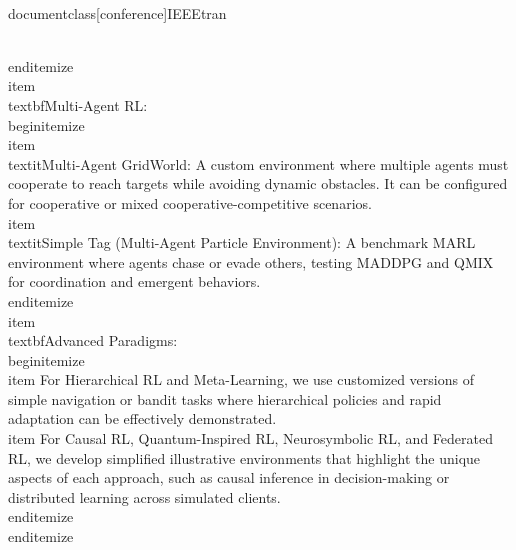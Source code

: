 \\documentclass[conference]{IEEEtran}
\begin{document}
    \\end{itemize}
    \\item \\textbf{Multi-Agent RL:}
    \\begin{itemize}
        \\item \\textit{Multi-Agent GridWorld:} A custom environment where multiple agents must cooperate to reach targets while avoiding dynamic obstacles. It can be configured for cooperative or mixed cooperative-competitive scenarios.
        \\item \\textit{Simple Tag (Multi-Agent Particle Environment):} A benchmark MARL environment where agents chase or evade others, testing MADDPG and QMIX for coordination and emergent behaviors.
    \\end{itemize}
    \\item \\textbf{Advanced Paradigms:}
    \\begin{itemize}
        \\item For Hierarchical RL and Meta-Learning, we use customized versions of simple navigation or bandit tasks where hierarchical policies and rapid adaptation can be effectively demonstrated.
        \\item For Causal RL, Quantum-Inspired RL, Neurosymbolic RL, and Federated RL, we develop simplified illustrative environments that highlight the unique aspects of each approach, such as causal inference in decision-making or distributed learning across simulated clients.
    \\end{itemize}
\\end{itemize}
\end{document}
